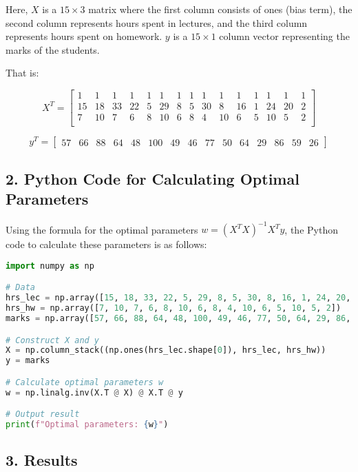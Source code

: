 \documentclass[a4paper,10pt]{article}
\begin{document}
Here, \( X \) is a \( 15 \times 3 \) matrix where the first column consists of ones (bias term), the second column represents hours spent in lectures, and the third column represents hours spent on homework. \( y \) is a \( 15 \times 1 \) column vector representing the marks of the students.

That is:

\[
X^T = \left[\begin{array}{cccccccccccccccc}
1 & 1 & 1 & 1 & 1 & 1 & 1 & 1 & 1 & 1 & 1 & 1 & 1 & 1 & 1 \\
15 & 18 & 33 & 22 & 5 & 29 & 8 & 5 & 30 & 8 & 16 & 1 & 24 & 20 & 2 \\
7 & 10 & 7 & 6 & 8 & 10 & 6 & 8 & 4 & 10 & 6 & 5 & 10 & 5 & 2 \\
\end{array}\right]
\]

\[
y^T = \left[\begin{array}{ccccccccccccccc}
57 & 66 & 88 & 64 & 48 & 100 & 49 & 46 & 77 & 50 & 64 & 29 & 86 & 59 & 26
\end{array}\right]
\]

\subsection*{2. Python Code for Calculating Optimal Parameters}

Using the formula for the optimal parameters \( w = (X^T X)^{-1} X^T y \), the Python code to calculate these parameters is as follows:

\begin{lstlisting}[language=Python, caption=Python Code for Optimal Parameters]
import numpy as np

# Data
hrs_lec = np.array([15, 18, 33, 22, 5, 29, 8, 5, 30, 8, 16, 1, 24, 20, 2])
hrs_hw = np.array([7, 10, 7, 6, 8, 10, 6, 8, 4, 10, 6, 5, 10, 5, 2])
marks = np.array([57, 66, 88, 64, 48, 100, 49, 46, 77, 50, 64, 29, 86, 59, 26])

# Construct X and y
X = np.column_stack((np.ones(hrs_lec.shape[0]), hrs_lec, hrs_hw))
y = marks

# Calculate optimal parameters w
w = np.linalg.inv(X.T @ X) @ X.T @ y

# Output result
print(f"Optimal parameters: {w}")
\end{lstlisting}

\subsection*{3. Results}
\end{document}

